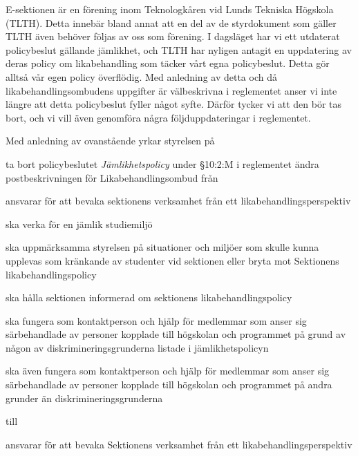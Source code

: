 \documentclass[../_main/handlingar.tex]{subfiles}
\begin{document}
E-sektionen är en förening inom Teknologkåren vid Lunds Tekniska Högskola (TLTH). Detta innebär bland annat att en del av de styrdokument som gäller TLTH även behöver följas av oss som förening.
I dagsläget har vi ett utdaterat policybeslut gällande jämlikhet, och TLTH har nyligen antagit en uppdatering av deras policy om likabehandling som täcker vårt egna policybeslut. Detta gör alltså vår egen policy överflödig.
Med anledning av detta och då likabehandlingsombudens uppgifter är välbeskrivna i reglementet anser vi inte längre att detta policybeslut fyller något syfte. Därför tycker vi att den bör tas bort, och vi vill även genomföra några följduppdateringar i reglementet.

Med anledning av ovanstående yrkar styrelsen på

\begin{attsatser}
    \att ta bort policybeslutet \emph{Jämlikhetspolicy}
    \att under \S10:2:M i reglementet ändra postbeskrivningen för Likabehandlingsombud från\par
    {\it
        \begin{tightdashlist}
            \item ansvarar för att bevaka sektionens verksamhet från ett likabehandlingsperspektiv
            \item ska verka för en jämlik studiemiljö
            \item ska uppmärksamma styrelsen på situationer och miljöer som skulle kunna upplevas som kränkande av studenter vid sektionen eller bryta mot Sektionens likabehandlingspolicy
            \item ska hålla sektionen informerad om sektionens likabehandlingspolicy
            \item ska fungera som kontaktperson och hjälp för medlemmar som anser sig särbehandlade av personer kopplade till högskolan och programmet på grund av någon av diskrimineringsgrunderna listade i jämlikhetspolicyn
            \item ska även fungera som kontaktperson och hjälp för medlemmar som anser sig särbehandlade av personer kopplade till högskolan och programmet på andra grunder än diskrimineringsgrunderna
        \end{tightdashlist}
    }\par
    till\par
    {\it
    \begin{tightdashlist}
        \item ansvarar för att bevaka Sektionens verksamhet från ett likabehandlingsperspektiv

\end{tightdashlist}}
\end{attsatser}
\end{document}
